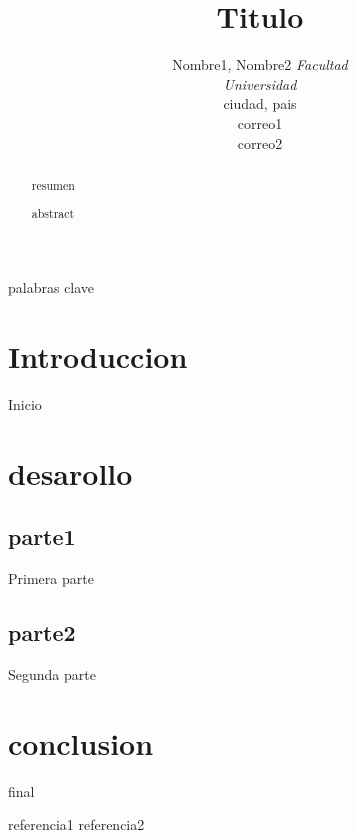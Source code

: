 \documentclass[conference]{IEEEtran}
\begin{document}
    
    \title{Titulo}

    \author
    {
        \IEEEauthorblockN
        {
            Nombre1, Nombre2
        }
        \IEEEauthorblockA
        {
            \textit{Facultad}\\
            \textit{Universidad}\\
            ciudad, pais\\
            correo1\\correo2
        }
    }

    \maketitle

    \begin{abstract}
    resumen
    \end{abstract}

    \def\abstractname{abstract}
    \begin{abstract}
    abstract
    \end{abstract}

    \begin{IEEEkeywords}
    palabras clave
    \end{IEEEkeywords}

    \section{Introduccion}

        Inicio

    \section{desarollo}
        \subsection{parte1}

            Primera parte \cite{b1}

        \subsection{parte2}

            Segunda parte \cite{b2}
    
    \section{conclusion}

        final \cite{b1}\cite{b2}

    \begin{thebibliography}{00}
     referencia1
     referencia2
    \end{thebibliography}
\end{document}
